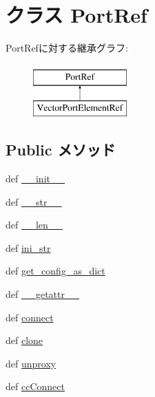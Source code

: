 \hypertarget{classm5_1_1params_1_1PortRef}{
\section{クラス PortRef}
\label{classm5_1_1params_1_1PortRef}
}
PortRefに対する継承グラフ:\begin{figure}[H]
\begin{center}
\leavevmode
\includegraphics[height=2cm]{classm5_1_1params_1_1PortRef}
\end{center}
\end{figure}
\subsection*{Public メソッド}
\begin{DoxyCompactItemize}
\item 
def \hyperlink{classm5_1_1params_1_1PortRef_ac775ee34451fdfa742b318538164070e}{\_\-\_\-init\_\-\_\-}
\item 
def \hyperlink{classm5_1_1params_1_1PortRef_aa7a4b9bc0941308e362738503137460e}{\_\-\_\-str\_\-\_\-}
\item 
def \hyperlink{classm5_1_1params_1_1PortRef_af6412d48d9a71eac81e3195b52455aaa}{\_\-\_\-len\_\-\_\-}
\item 
def \hyperlink{classm5_1_1params_1_1PortRef_a33ebe6cd32bcbd15465fc28b9d94bf82}{ini\_\-str}
\item 
def \hyperlink{classm5_1_1params_1_1PortRef_ab1772c0da7b9e12819e1c0373513c53c}{get\_\-config\_\-as\_\-dict}
\item 
def \hyperlink{classm5_1_1params_1_1PortRef_a0a990b3ec3889d40889daca9ee5e4695}{\_\-\_\-getattr\_\-\_\-}
\item 
def \hyperlink{classm5_1_1params_1_1PortRef_a0f3e881a92d7a1b4d6d07d9e63180c98}{connect}
\item 
def \hyperlink{classm5_1_1params_1_1PortRef_a4110248fff184e40b53c1cfa2bc3c649}{clone}
\item 
def \hyperlink{classm5_1_1params_1_1PortRef_a587cd3c1e899640dc09d63793aa8093b}{unproxy}
\item 
def \hyperlink{classm5_1_1params_1_1PortRef_addaf6e2a0c3ee33ece43bba237efcd7d}{ccConnect}
\end{DoxyCompactItemize}
